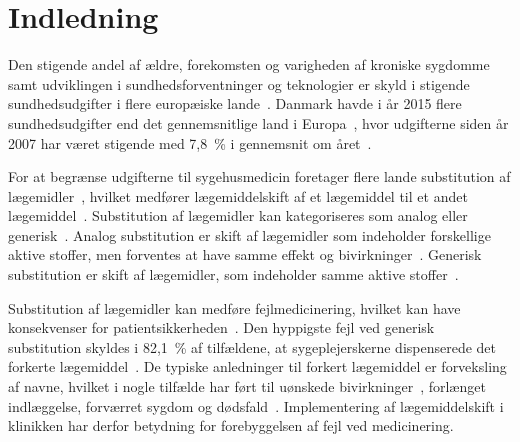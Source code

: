 \chapter{Indledning}
Den stigende andel af ældre, forekomsten og varigheden af kroniske sygdomme samt udviklingen i sundhedsforventninger og teknologier er skyld i stigende sundhedsudgifter i flere europæiske lande~\citep{Ess2003}. Danmark havde i år 2015 flere sundhedsudgifter end det gennemsnitlige land i Europa~\citep{EU2017}, hvor udgifterne siden år 2007 har været stigende med 7,8~\% i gennemsnit om året~\citep{Sundhed2016}.

For at begrænse udgifterne til sygehusmedicin foretager flere lande substitution af lægemidler~\citep{Ess2003,Johnston2011, Garcia2017}, hvilket medfører lægemiddelskift af et lægemiddel til et andet lægemiddel~\citep{DanskSelskabforPatientsikkerhed2009, Kairi2017}. %
Substitution af lægemidler kan kategoriseres som analog eller generisk~\citep{DanskSelskabforPatientsikkerhed2009}.  
Analog substitution er skift af lægemidler som indeholder forskellige aktive stoffer, men forventes at have samme effekt og bivirkninger~\citep{DanskSelskabforPatientsikkerhed2009,Kairi2017}. 
Generisk substitution er skift af lægemidler, som indeholder samme aktive stoffer~\citep{DanskSelskabforPatientsikkerhed2009,Kairi2017, Lopes2012}. 

Substitution af lægemidler kan medføre fejlmedicinering, hvilket kan have konsekvenser for patientsikkerheden~\citep{Hakonsen2010}. Den hyppigste fejl ved generisk substitution skyldes i 82,1~\% af tilfældene, at sygeplejerskerne dispenserede det forkerte lægemiddel~\citep{Hakonsen2010}. De typiske anledninger til forkert lægemiddel er forveksling af navne, hvilket i nogle tilfælde har ført til uønskede bivirkninger~\citep{Basco2010}, forlænget indlæggelse, forværret sygdom og dødsfald~\citep{DanskSelskabforPatientsikkerhed2009}. Implementering af lægemiddelskift i klinikken har derfor betydning for forebyggelsen af fejl ved medicinering.

